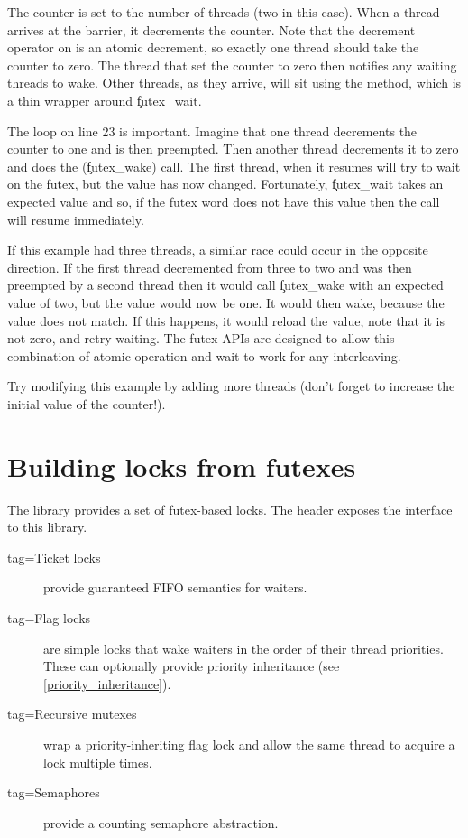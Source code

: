 The counter is set to the number of threads (two in this case).
When a thread arrives at the barrier, it decrements the counter.
Note that the decrement operator on  is an atomic decrement, so exactly one thread should take the counter to zero.
The thread that set the counter to zero then notifies any waiting threads to wake.
Other threads, as they arrive, will sit using the  method, which is a thin wrapper around \c{futex_wait}.

The loop on line 23 is important.
Imagine that one thread decrements the counter to one and is then preempted.
Then another thread decrements it to zero and does the  (\c{futex_wake}) call.
The first thread, when it resumes will try to wait on the futex, but the value has now changed.
Fortunately, \c{futex_wait} takes an expected value and so, if the futex word does not have this value then the call will resume immediately.

If this example had three threads, a similar race could occur in the opposite direction.
If the first thread decremented from three to two and was then preempted by a second thread then it would call \c{futex_wake} with an expected value of two, but the value would now be one.
It would then wake, because the value does not match.
If this happens, it would reload the value, note that it is not zero, and retry waiting.
The futex APIs are designed to allow this combination of atomic operation and wait to work for any interleaving.

Try modifying this example by adding more threads (don't forget to increase the initial value of the counter!).

\section{Building locks from futexes}

The  library provides a set of futex-based locks.
The  header exposes the interface to this library.

\begin{description}
	\item[tag=Ticket locks]{ provide guaranteed FIFO semantics for waiters.}
	\item[tag=Flag locks]{  are simple locks that wake waiters in the order of their thread priorities.
	      These can optionally provide priority inheritance (see \ref{priority_inheritance}).}
	\item[tag=Recursive mutexes]{ wrap a priority-inheriting flag lock and allow the same thread to acquire a lock multiple times.}
	\item[tag=Semaphores]{ provide a counting semaphore abstraction.}
\end{description}

